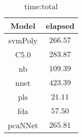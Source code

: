 \begin{table}[!ht]
	\centering
	\begin{tabular}{|c|c|}
		\hline
		Model & elapsed \\ \hline
		svmPoly & $266.57$ \\ \hline
		C5.0 & $283.87$ \\ \hline
		nb & $109.39$ \\ \hline
		nnet & $423.39$ \\ \hline
		pls & $21.11$ \\ \hline
		fda & $57.50$ \\ \hline
		pcaNNet & $265.81$ \\ \hline
	\end{tabular}
	\caption{time:total}
	\label{tab:time:total}
\end{table}
